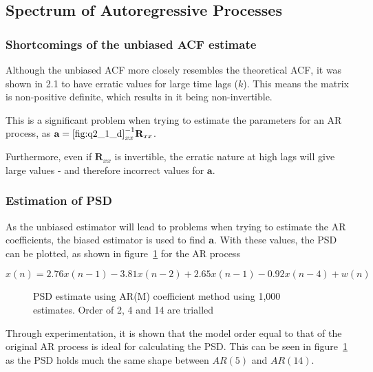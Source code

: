 \documentclass[main.tex]{subfiles}
\begin{document}
\subsection{Spectrum of Autoregressive Processes}


\subsubsection{Shortcomings of the unbiased ACF estimate}

Although the unbiased ACF more closely resembles the theoretical ACF, it was shown in 2.1 to have erratic values for large time lags ($k$). This means the matrix is non-positive definite, which results in it being non-invertible. 

This is a significant problem when trying to estimate the parameters for an AR process, as $\textbf{a} = \ref{fig:q2_1_d}_{xx}^{-1}\textbf{R}_{xx}$.

Furthermore, even if $\textbf{R}_{xx}$ is invertible, the erratic nature at high lags will give large values - and therefore incorrect values for $\textbf{a}$.

\subsubsection{Estimation of PSD}

As the unbiased estimator will lead to problems when trying to estimate the AR coefficients, the biased estimator is used to find $\textbf{a}$. With these values, the PSD can be plotted, as shown in figure~\ref{fig:q2_3_b} for the AR process

\[
x(n) = 2.76x(n-1) - 3.81x(n-2) +2.65x(n-1) -0.92x(n-4) + w(n)
\]

\begin{figure}[H]
	\centering 
	\resizebox{\textwidth}{!}{}
	\caption{PSD estimate using AR(M) coefficient method using 1,000 estimates. Order of 2, 4 and 14 are trialled}
	\label{fig:q2_3_b}
\end{figure}

Through experimentation, it is shown that the model order equal to that of the original AR process is ideal for calculating the PSD. This can be seen in figure~\ref{fig:q2_3_b} as the PSD holds much the same shape between $AR(5)$ and $AR(14)$. 
\end{document}
